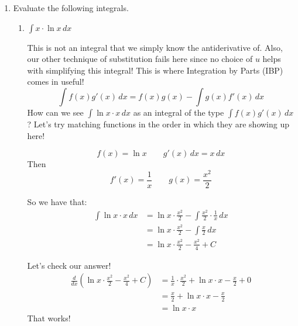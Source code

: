 \documentclass[main]{subfiles}
\begin{document}
\begin{enumerate}
When integrating by parts, we want to choose part of our integrand as $u$ and the other part as $dv$. There is an element of trial-and-error, so in this next problem we will develop some intuition behind how to make strategic choices for $u$ and $dv$. If your first choice doesn't work, no worries! Just try again with new choices!

\item 


Evaluate the following integrals.
   \begin{enumerate}
\item \begin{problem}[\vfill]
 $\displaystyle \int x \cdot \ln x   \, dx$
\end{problem}

 \begin{solution}
This is not an integral that we simply know the antiderivative of. Also, our other technique of substitution fails here since no choice of $u$ helps with simplifying this integral! This is where Integration by Parts (IBP) comes in useful! 
$$\int f(x)g'(x) \, dx = f(x)g(x) - \int g(x) f'(x) \, dx$$
How can we see $\displaystyle \int \ln x \cdot x  \, dx$ as an integral of the type $\displaystyle \int f(x)g'(x) \, dx$? Let's try matching functions in the order in which they are showing up here! 

$$f(x) = \ln x \quad \quad g'(x) \, dx = x \, dx$$
Then $$f'(x) = \frac{1}{x} \quad \quad g(x) = \frac{x^2}{2}$$

So we have that:
\begin{align*}
\int \ln x \cdot x  \, dx &= \ln x \cdot \frac{x^2}{2} - \int  \frac{x^2}{2} \cdot \frac{1}{x} \, dx \\
&=  \ln x \cdot \frac{x^2}{2} - \int \frac{x}{2} \, dx \\
&= \ln x \cdot \frac{x^2}{2} - \frac{x^2}{4} + C
\end{align*}

Let's check our answer! 
\begin{align*}
\frac{d}{dx} \left(\ln x \cdot \frac{x^2}{2} - \frac{x^2}{4} + C\right) &= \frac{1}{x}\cdot  \frac{x^2}{2} + \ln x \cdot x - \frac{x}{2} + 0 \\
&= \frac{x}{2} +  \ln x \cdot x - \frac{x}{2} \\
&=  \ln x \cdot x
\end{align*}
That works! 
\end{solution}


\end{enumerate}
\end{enumerate}
\end{document}
